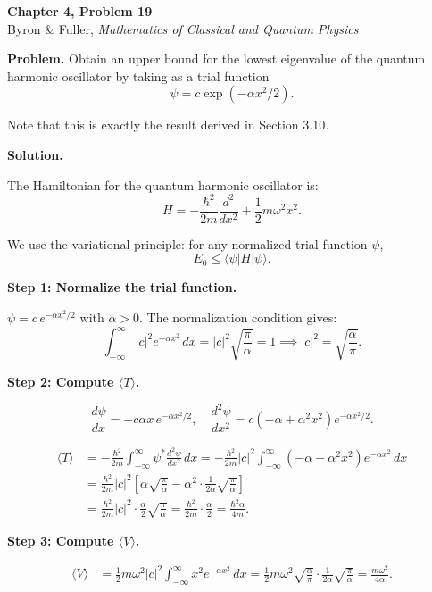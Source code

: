 \documentclass[12pt]{article}
\begin{document}
\begin{center}
{\Large\bfseries Chapter 4, Problem 19}\\[6pt]
Byron \& Fuller, \textit{Mathematics of Classical and Quantum Physics}
\end{center}

\bigskip

\textbf{Problem.} Obtain an upper bound for the lowest eigenvalue of the quantum harmonic oscillator by taking as a trial function
\[
\psi = c\exp(-\alpha x^2/2).
\]

Note that this is exactly the result derived in Section 3.10.

\bigskip
\textbf{Solution.}

The Hamiltonian for the quantum harmonic oscillator is:
\[
H = -\frac{\hbar^2}{2m}\frac{d^2}{dx^2} + \frac{1}{2}m\omega^2 x^2.
\]

We use the variational principle: for any normalized trial function $\psi$,
\[
E_0 \leq \langle\psi|H|\psi\rangle.
\]

\textbf{Step 1: Normalize the trial function.}

$\psi = c\,e^{-\alpha x^2/2}$ with $\alpha > 0$. The normalization condition gives:
\[
\int_{-\infty}^{\infty}|c|^2 e^{-\alpha x^2}\,dx = |c|^2\sqrt{\frac{\pi}{\alpha}} = 1 \implies |c|^2 = \sqrt{\frac{\alpha}{\pi}}.
\]

\textbf{Step 2: Compute $\langle T\rangle$.}

\[
\frac{d\psi}{dx} = -c\alpha x\, e^{-\alpha x^2/2}, \quad \frac{d^2\psi}{dx^2} = c(-\alpha + \alpha^2 x^2)e^{-\alpha x^2/2}.
\]

\begin{align*}
\langle T\rangle &= -\frac{\hbar^2}{2m}\int_{-\infty}^{\infty}\psi^*\frac{d^2\psi}{dx^2}\,dx = -\frac{\hbar^2}{2m}|c|^2\int_{-\infty}^{\infty}(-\alpha + \alpha^2 x^2)e^{-\alpha x^2}\,dx \\
&= \frac{\hbar^2}{2m}|c|^2\left[\alpha\sqrt{\frac{\pi}{\alpha}} - \alpha^2\cdot\frac{1}{2\alpha}\sqrt{\frac{\pi}{\alpha}}\right] \\
&= \frac{\hbar^2}{2m}|c|^2\cdot\frac{\alpha}{2}\sqrt{\frac{\pi}{\alpha}} = \frac{\hbar^2}{2m}\cdot\frac{\alpha}{2} = \frac{\hbar^2\alpha}{4m}.
\end{align*}

\textbf{Step 3: Compute $\langle V\rangle$.}

\begin{align*}
\langle V\rangle &= \frac{1}{2}m\omega^2|c|^2\int_{-\infty}^{\infty}x^2 e^{-\alpha x^2}\,dx = \frac{1}{2}m\omega^2\sqrt{\frac{\alpha}{\pi}}\cdot\frac{1}{2\alpha}\sqrt{\frac{\pi}{\alpha}} = \frac{m\omega^2}{4\alpha}.
\end{align*}
\end{document}
